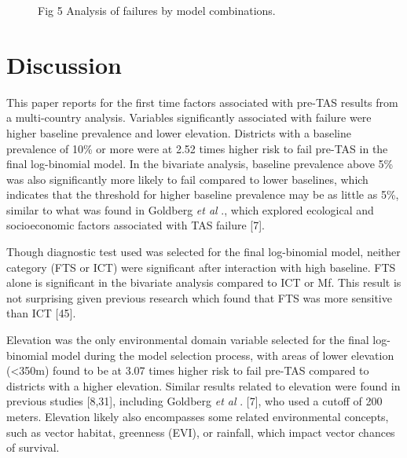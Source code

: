 \documentclass[11pt,a4paper]{article}
\begin{document}
\begin{figure}[h]
\caption{Fig 5 Analysis of failures by model combinations.}
\end{figure}

\section{Discussion}

This paper reports for the first time factors associated with pre-TAS results from a multi-country analysis. Variables significantly associated with failure were higher baseline prevalence and lower elevation. Districts with a baseline prevalence of 10\% or more were at 2.52 times higher risk to fail pre-TAS in the final log-binomial model. In the bivariate analysis, baseline prevalence above 5\% was also significantly more likely to fail compared to lower baselines, which indicates that the threshold for higher baseline prevalence may be as little as 5\%, similar to what was found in Goldberg \textit{et al} ., which explored ecological and socioeconomic factors associated with TAS failure [7].

Though diagnostic test used was selected for the final log-binomial model, neither category (FTS or ICT) were significant after interaction with high baseline. FTS alone is significant in the bivariate analysis compared to ICT or Mf. This result is not surprising given previous research which found that FTS was more sensitive than ICT [45].

Elevation was the only environmental domain variable selected for the final log-binomial model during the model selection process, with areas of lower elevation (<350m) found to be at 3.07 times higher risk to fail pre-TAS compared to districts with a higher elevation. Similar results related to elevation were found in previous studies [8,31], including Goldberg \textit{et al} . [7], who used a cutoff of 200 meters. Elevation likely also encompasses some related environmental concepts, such as vector habitat, greenness (EVI), or rainfall, which impact vector chances of survival.
\end{document}
